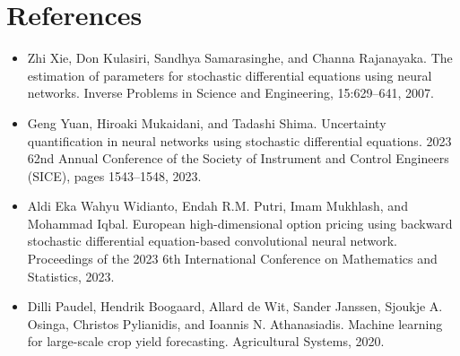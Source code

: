 \section*{References}
\begin{itemize}
    \item Zhi Xie, Don Kulasiri, Sandhya Samarasinghe, and Channa Rajanayaka. The estimation of parameters for stochastic differential equations using neural networks. Inverse Problems in Science and Engineering, 15:629–641, 2007.
    \item Geng Yuan, Hiroaki Mukaidani, and Tadashi Shima. Uncertainty quantification in neural networks using stochastic differential equations. 2023 62nd Annual Conference of the Society of Instrument and Control Engineers (SICE), pages 1543–1548, 2023.
    \item Aldi Eka Wahyu Widianto, Endah R.M. Putri, Imam Mukhlash, and Mohammad Iqbal. European high-dimensional option pricing using backward stochastic differential equation-based convolutional neural network. Proceedings of the 2023 6th International Conference on Mathematics and Statistics, 2023.
    \item Dilli Paudel, Hendrik Boogaard, Allard de Wit, Sander Janssen, Sjoukje A. Osinga, Christos Pylianidis, and Ioannis N. Athanasiadis. Machine learning for large-scale crop yield forecasting. Agricultural Systems, 2020.
\end{itemize}
